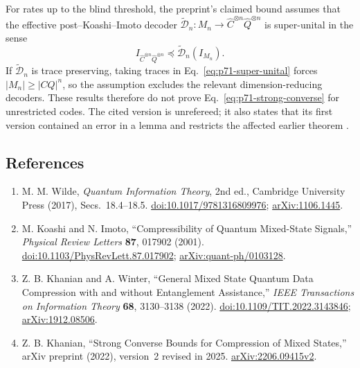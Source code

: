 \begin{itemize}
  For rates up to the blind threshold, the preprint's claimed bound assumes
  that the effective post--Koashi--Imoto decoder
  $\widetilde{\mathcal D}_n:M_n\to\widehat C^{\otimes n}\widehat Q^{\otimes n}$
  is super-unital in the sense
  \begin{equation}
    I_{\widehat C^{\otimes n}\widehat Q^{\otimes n}}
    \preceq\widetilde{\mathcal D}_n(I_{M_n}).
    \label{eq:p71-super-unital}
  \end{equation}
  If $\widetilde{\mathcal D}_n$ is trace preserving, taking traces in
  Eq.~\eqref{eq:p71-super-unital} forces
  $|M_n|\geq|CQ|^n$, so the assumption excludes the relevant
  dimension-reducing decoders.  These results therefore do not prove
  Eq.~\eqref{eq:p71-strong-converse} for unrestricted codes.  The cited
  version is unrefereed; it also states that its first version contained an
  error in a lemma and restricts the affected earlier theorem
  .
\end{itemize}

\subsection*{References}

\begin{enumerate}[label={},leftmargin=4.8em,labelsep=0.5em]
  \footnotesize
  \item[\textup{[Wil17]}]\label{ref:p71-wilde}
  M. M. Wilde, \emph{Quantum Information Theory}, 2nd ed., Cambridge
  University Press (2017), Secs.~18.4--18.5.
  \href{https://doi.org/10.1017/9781316809976}%
       {doi:10.1017/9781316809976};
  \href{https://arxiv.org/abs/1106.1445}{arXiv:1106.1445}.

  \item[\textup{[KI01]}]\label{ref:p71-koashi-imoto}
  M. Koashi and N. Imoto, ``Compressibility of Quantum Mixed-State Signals,''
  \emph{Physical Review Letters} \textbf{87}, 017902 (2001).
  \href{https://doi.org/10.1103/PhysRevLett.87.017902}%
       {doi:10.1103/PhysRevLett.87.017902};
  \href{https://arxiv.org/abs/quant-ph/0103128}%
       {arXiv:quant-ph/0103128}.

  \item[\textup{[KW22]}]\label{ref:p71-khanian-winter}
  Z. B. Khanian and A. Winter,
  ``General Mixed State Quantum Data Compression with and without
  Entanglement Assistance,'' \emph{IEEE Transactions on Information Theory}
  \textbf{68}, 3130--3138 (2022).
  \href{https://doi.org/10.1109/TIT.2022.3143846}%
       {doi:10.1109/TIT.2022.3143846};
  \href{https://arxiv.org/abs/1912.08506}{arXiv:1912.08506}.

  \item[\textup{[Kha25]}]\label{ref:p71-khanian-strong}
  Z. B. Khanian, ``Strong Converse Bounds for Compression of Mixed States,''
  arXiv preprint (2022), version~2 revised in 2025.
  \href{https://arxiv.org/abs/2206.09415v2}{arXiv:2206.09415v2}.
\end{enumerate}

